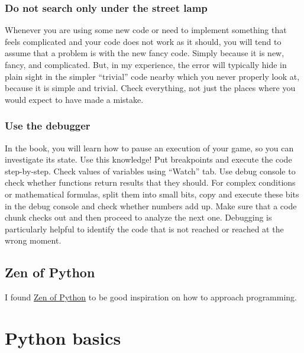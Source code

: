 \documentclass[
]{book}
\begin{document}
\hypertarget{do-not-search-only-under-the-street-lamp}{%
\subsection{Do not search only under the street lamp}\label{do-not-search-only-under-the-street-lamp}}

Whenever you are using some new code or need to implement something that feels complicated and your code does not work as it should, you will tend to assume that a problem is with the new fancy code. Simply because it is new, fancy, and complicated. But, in my experience, the error will typically hide in plain sight in the simpler ``trivial'' code nearby which you never properly look at, because it is simple and trivial. Check everything, not just the places where you would expect to have made a mistake.

\hypertarget{use-the-debugger}{%
\subsection{Use the debugger}\label{use-the-debugger}}

In the book, you will learn how to pause an execution of your game, so you can investigate its state. Use this knowledge! Put breakpoints and execute the code step-by-step. Check values of variables using ``Watch'' tab. Use debug console to check whether functions return results that they should. For complex conditions or mathematical formulas, split them into small bits, copy and execute these bits in the debug console and check whether numbers add up. Make sure that a code chunk checks out and then proceed to analyze the next one. Debugging is particularly helpful to identify the code that is not reached or reached at the wrong moment.

\hypertarget{zen-of-python}{%
\section{Zen of Python}\label{zen-of-python}}

I found \href{https://www.python.org/dev/peps/pep-0020/}{Zen of Python} to be good inspiration on how to approach programming.

\hypertarget{python-basics}{%
\chapter{Python basics}\label{python-basics}}
\end{document}
